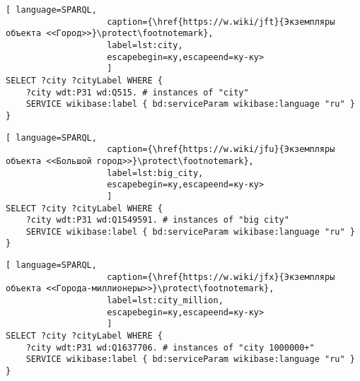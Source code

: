 
\begin{lstlisting}[ language=SPARQL, 
                    caption={\href{https://w.wiki/jft}{Экземпляры объекта <<Город>>}\protect\footnotemark},
                    label=lst:city, 
                    escapebegin=ку,escapeend=ку-ку>
                    ]
SELECT ?city ?cityLabel WHERE {
	?city wdt:P31 wd:Q515. # instances of "city"
	SERVICE wikibase:label { bd:serviceParam wikibase:language "ru" }
}
\end{lstlisting}


\begin{lstlisting}[ language=SPARQL, 
                    caption={\href{https://w.wiki/jfu}{Экземпляры объекта <<Большой город>>}\protect\footnotemark},
                    label=lst:big_city, 
                    escapebegin=ку,escapeend=ку-ку>
                    ]
SELECT ?city ?cityLabel WHERE {
	?city wdt:P31 wd:Q1549591. # instances of "big city"    
	SERVICE wikibase:label { bd:serviceParam wikibase:language "ru" }
}
\end{lstlisting}

\begin{lstlisting}[ language=SPARQL, 
                    caption={\href{https://w.wiki/jfx}{Экземпляры объекта <<Города-миллионеры>>}\protect\footnotemark},
                    label=lst:city_million, 
                    escapebegin=ку,escapeend=ку-ку>
                    ]
SELECT ?city ?cityLabel WHERE {
	?city wdt:P31 wd:Q1637706. # instances of "city 1000000+" 
	SERVICE wikibase:label { bd:serviceParam wikibase:language "ru" }
}
\end{lstlisting}

